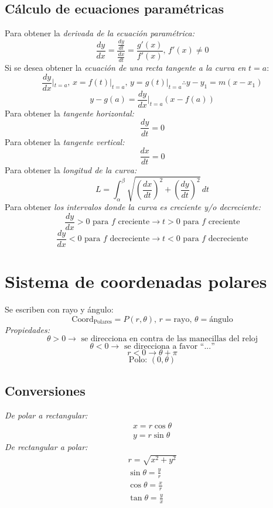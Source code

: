 \documentclass[letterpaper, 12pt]{article}
\begin{document}
        \subsection{Cálculo de ecuaciones paramétricas}
        Para obtener la \emph{derivada de la ecuación paramétrica: }
        \[\frac{dy}{dx}=\frac{\frac{dy}{dt}}{\frac{dx}{dt}}=\frac{g'(x)}{f'(x)},\, f'(x)\neq 0\]
        Si se desea obtener la \emph{ecuación de una recta tangente a la curva en} \(t=a\):
        \[\frac{dy}{dx}|_{t=a},\, x=f(t)|_{t=a},\, y=g(t)|_{t=a}\therefore y-y_1=m(x-x_1)\]
        \[y-g(a)=\frac{dy}{dx}|_{t=a}(x-f(a))\]
        Para obtener la \emph{tangente horizontal:}
        \[\frac{dy}{dt}=0\]
        Para obtener la \emph{tangente vertical:}
        \[\frac{dx}{dt}=0\]
        Para obtener la \emph{longitud de la curva:}
        \[L=\int_{\alpha}^{\beta}\sqrt{\left(\frac{dx}{dt}\right)^2+\left(\frac{dy}{dt}\right)^2}\, dt\]
        Para obtener \emph{los intervalos donde la curva es creciente y/o decreciente:}
        \[\frac{dy}{dx}>0 \text{ para }f\text{ creciente}\rightarrow t>0 \text{ para }f\text{ creciente}\]
        \[\frac{dy}{dx}<0 \text{ para }f\text{ decreciente}\rightarrow t<0 \text{ para }f\text{ decreciente}\]
        \section{Sistema de coordenadas polares}
        Se escriben con rayo y ángulo:
        \[\text{Coord}_{\text{Polares}}=P(r,\theta),\, r=\text{rayo},\, \theta=\text{ángulo}\]
        \emph{Propiedades:}
        \[\theta>0\rightarrow \text{ se direcciona en contra de las manecillas del reloj}\]
        \[\theta<0\rightarrow \text{ se direcciona a favor ``...''}\]
        \[r<0\rightarrow \theta+\pi\]
        \[\text{Polo: }(0,\theta)\]
        \subsection{Conversiones}
        \emph{De polar a rectangular:} 
        \[\begin{matrix}
            x=r\cos\theta\\
            y=r\sin\theta
        \end{matrix}\]
        \emph{De rectangular a polar:}
        \[\begin{matrix}
            r=\sqrt{x^2+y^2}\\
            \sin\theta=\frac{y}{r}\\
            \cos\theta=\frac{x}{r}\\
            \tan\theta=\frac{y}{x}
        \end{matrix}\]
\end{document}

